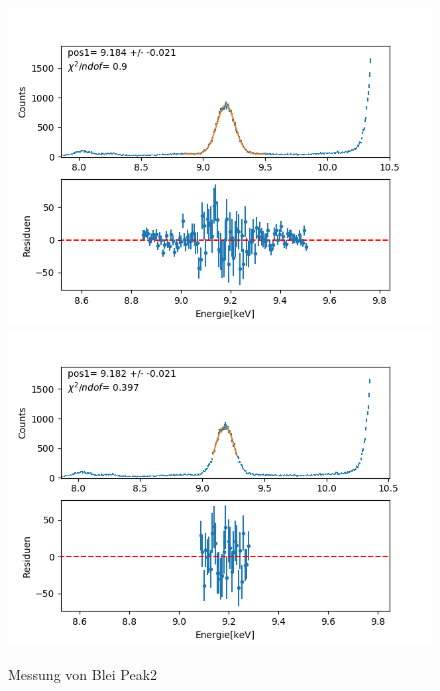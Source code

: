 \documentclass[12pt,a4paper]{article}
\begin{document}
\begin{figure}[H]
\centering
\includegraphics[scale=0.49]{Bilder/roentgen_spektren/blei/pb2_1.png}
\includegraphics[scale=0.49]{Bilder/roentgen_spektren/blei/pb2_2.png}
\caption{Messung von Blei Peak2}
\end{figure}
\end{document}
